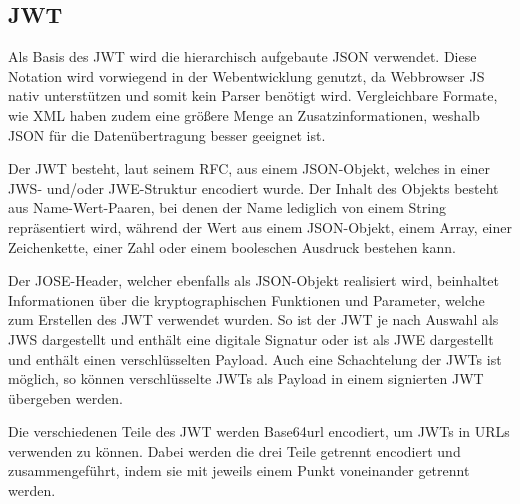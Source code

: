 \subsection{\acl{JWT}}\label{chapter:jwt}

Als Basis des \ac{JWT} wird die hierarchisch aufgebaute \ac{JSON} verwendet.
Diese Notation wird vorwiegend in der Webentwicklung genutzt, da Webbrowser \ac*{JS} nativ unterstützen und somit kein Parser benötigt wird.
Vergleichbare Formate, wie \ac*{XML} haben zudem eine größere Menge an Zusatzinformationen, weshalb \ac{JSON} für die Datenübertragung besser geeignet ist.

Der \ac{JWT} besteht, laut seinem \ac{RFC}, aus einem \ac{JSON}-Objekt, welches in einer \ac*{JWS}- und/oder \ac*{JWE}-Struktur encodiert wurde.
Der Inhalt des Objekts besteht aus Name-Wert-Paaren, bei denen der Name lediglich von einem String repräsentiert wird, während der Wert aus einem \ac{JSON}-Objekt, einem Array, einer Zeichenkette, einer Zahl oder einem booleschen Ausdruck bestehen kann.

Der \ac*{JOSE}-Header, welcher ebenfalls als \ac{JSON}-Objekt realisiert wird, beinhaltet Informationen über die kryptographischen Funktionen und Parameter, welche zum Erstellen des \ac{JWT} verwendet wurden.
So ist der \ac{JWT} je nach Auswahl als \acs*{JWS} dargestellt und enthält eine digitale Signatur oder ist als \acs*{JWE} dargestellt und enthält einen verschlüsselten Payload.
Auch eine Schachtelung der \acp{JWT} ist möglich, so können verschlüsselte \acp{JWT} als Payload in einem signierten \ac{JWT} übergeben werden.

Die verschiedenen Teile des \ac{JWT} werden Base64url encodiert, um \acp{JWT} in \acp{URL} verwenden zu können.
Dabei werden die drei Teile getrennt encodiert und zusammengeführt, indem sie mit jeweils einem Punkt voneinander getrennt werden.\autocite{rf-JSONORG}\autocite{rf-RFC7519}
